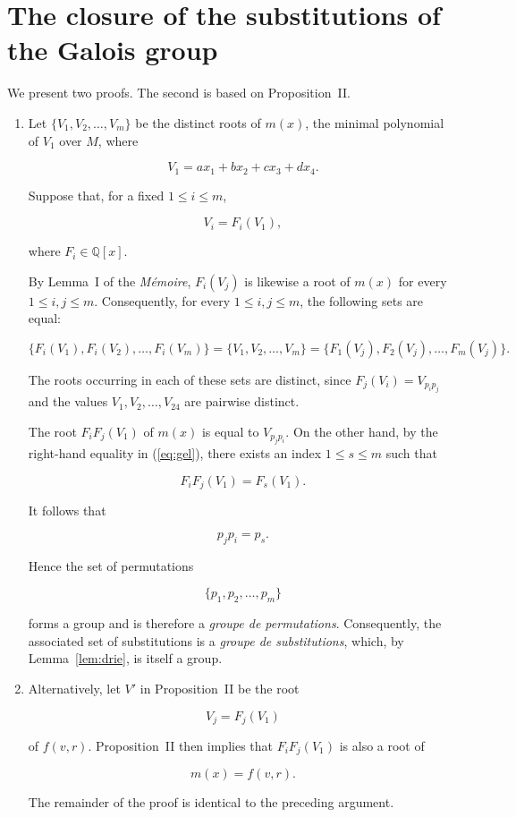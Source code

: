 \documentclass[a4paper,11pt]{article}
\begin{document}
\section{The closure of the substitutions of the Galois group}

We present two proofs. The second is based on Proposition~II.

\begin{enumerate}
	
	\item
	
	Let \(\{V_1,V_2,\dots,V_m\}\) be the distinct roots of \(m(x)\), the minimal polynomial of \(V_1\) over \(M\), where
	
	\[
	V_1=ax_1+bx_2+cx_3+dx_4.
	\]
	
	Suppose that, for a fixed \(1\le i\le m\),
	
	\[
	V_i=F_i(V_1),
	\]
	
	where \(F_i\in\mathbb{Q}[x]\).
	
	By Lemma~I of the \textit{Mémoire}, \(F_i(V_j)\) is likewise a root of \(m(x)\) for every \(1\le i,j\le m\). Consequently, for every \(1\le i,j\le m\), the following sets are equal:
	
	\begin{equation}
		\label{eq:gel}
		\{F_i(V_1),F_i(V_2),\dots,F_i(V_m)\}
		=
		\{V_1,V_2,\dots,V_m\}
		=
		\{F_1(V_j),F_2(V_j),\dots,F_m(V_j)\}.
	\end{equation}
	
	The roots occurring in each of these sets are distinct, since
	\(F_j(V_i)=V_{p_ip_j}\) and the values
	\(V_1,V_2,\dots,V_{24}\) are pairwise distinct.
	
	The root \(F_iF_j(V_1)\) of \(m(x)\) is equal to \(V_{p_jp_i}\). On the other hand, by the right-hand equality in (\ref{eq:gel}), there exists an index \(1\le s\le m\) such that
	
	\[
	F_iF_j(V_1)=F_s(V_1).
	\]
	
	It follows that
	
	\[
	p_jp_i=p_s.
	\]
	
	Hence the set of permutations
	
	\[
	\{p_1,p_2,\dots,p_m\}
	\]
	
	forms a group and is therefore a \textit{groupe de permutations}. Consequently, the associated set of substitutions is a \textit{groupe de substitutions}, which, by Lemma~\ref{lem:drie}, is itself a group.
	
	\item
	
	Alternatively, let \(V'\) in Proposition~II be the root
	
	\[
	V_j=F_j(V_1)
	\]
	
	of \(f(v,r)\). Proposition~II then implies that \(F_iF_j(V_1)\) is also a root of
	
	\[
	m(x)=f(v,r).
	\]
	
	The remainder of the proof is identical to the preceding argument.
	
\end{enumerate}
\end{document}
